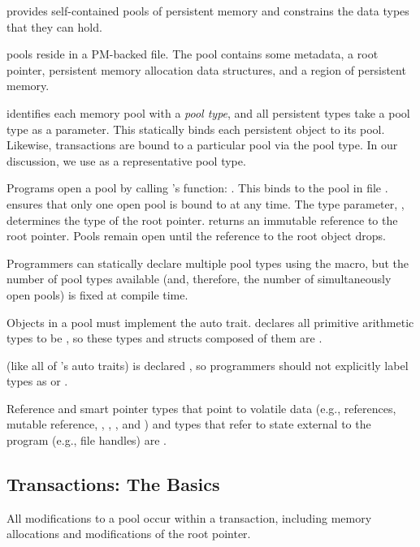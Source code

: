 \This{} provides self-contained pools of persistent memory and constrains the
data types that they can hold.

 \This{} pools reside in a
PM-backed file.  The pool contains some metadata, a root pointer, persistent
memory allocation data structures, and a region of persistent memory.

\This{} identifies each memory pool with a \emph{pool type}, and all persistent
types take a pool type as a parameter.  This statically binds each persistent
object to its pool.  Likewise, transactions are bound to a particular pool via
the pool type.  In our discussion, we use  as a representative pool
type.

Programs open a pool by calling 's  function: .  This binds  to the pool in file
.  \This{} ensures that only one open pool is bound to  at
any time.  The type parameter, , determines the type of the root
pointer.   returns an immutable reference to the root pointer.  Pools remain
open until the reference to the root object drops.

Programmers can statically declare multiple pool types using the
 macro, but the number of pool types available (and,
therefore, the number of simultaneously open pools) is fixed at compile time.

 Objects in a pool must implement the
 auto trait.  \This{} declares all primitive arithmetic types to be
, so these types and structs composed of them are .

 (like all of \this{}'s auto traits) is declared
, so programmers should not explicitly label types as 
or .

Reference and smart pointer types that point to volatile data (e.g.,
references, mutable reference, , , , and
) and types that refer to state external to the program (e.g., file
handles) are .

\subsection{Transactions: The Basics}



All modifications to a \this{} pool occur within a transaction, including
memory allocations and modifications of the root pointer.

